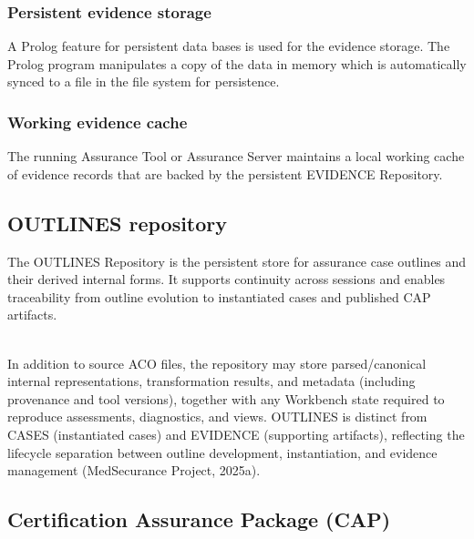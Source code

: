 \documentclass[12pt,twoside,a4paper]{article}
\begin{document}
\hypertarget{persistent-evidence-storage}{%
\subsubsection{Persistent evidence storage}\label{persistent-evidence-storage}}

A Prolog feature for persistent data bases is used for the evidence storage. The Prolog program manipulates a copy of the data in memory which is automatically synced to a file in the file system for persistence.

\hypertarget{working-evidence-cache}{%
\subsubsection{Working evidence cache}\label{working-evidence-cache}}

The running Assurance Tool or Assurance Server maintains a local working cache of evidence records that are backed by the persistent EVIDENCE Repository.

\hypertarget{outlines-repository}{%
\subsection{OUTLINES repository}\label{outlines-repository}}

\protect\hypertarget{_Toc217342243}{}{}The OUTLINES Repository is the persistent store for assurance case outlines and their derived internal forms. It supports continuity across sessions and enables traceability from outline evolution to instantiated cases and published CAP artifacts.\\
\strut \\
In addition to source ACO files, the repository may store parsed/canonical internal representations, transformation results, and metadata (including provenance and tool versions), together with any Workbench state required to reproduce assessments, diagnostics, and views. OUTLINES is distinct from CASES (instantiated cases) and EVIDENCE (supporting artifacts), reflecting the lifecycle separation between outline development, instantiation, and evidence management (MedSecurance Project, 2025a).

\hypertarget{certification-assurance-package-cap}{%
\subsection{Certification Assurance Package (CAP)}\label{certification-assurance-package-cap}}
\end{document}
